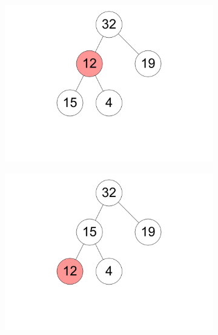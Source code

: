 \documentclass[11pt,a4paper]{article}
\begin{document}
\begin{loesung}
\begin{enumerate}
\begin{figure}[h!]
\begin{subfigure}[b]{0.23\textwidth}
                \includegraphics[width=\textwidth]{img/b12}
            \end{subfigure}
            \begin{subfigure}[b]{0.23\textwidth}
                \centering
                \includegraphics[width=\textwidth]{img/b13}
            \end{subfigure}
        \end{figure}
        \FloatBarrier
        


\end{enumerate}
\end{loesung}
\end{document}
